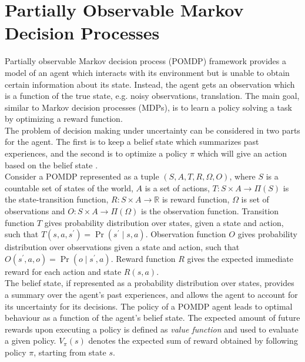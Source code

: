 \section{Partially Observable Markov Decision Processes}
\label{sec:belief_POMDP}
Partially observable Markov decision process (POMDP) framework provides a model of an agent which interacts with its environment but is unable to obtain certain information about its state. Instead, the agent gets an observation which is a function of the true state, e.g. noisy observations, translation. The main goal, similar to Markov decision processes (MDPs), is to learn a policy solving a task by optimizing a reward function. \\
The problem of decision making under uncertainty can be considered in two parts for the agent. The first is to keep a belief state which summarizes past experiences, and the second is to optimize a policy $ \pi $ which will give an action based on the belief state \cite{KAELBLING199899,Murphy2000}.\\
Consider a POMDP represented as a tuple $ (S, A, T, R, \Omega, O) $, where $ S $ is a countable set of states of the world, $ A $ is a set of actions, $ T: S \times A \rightarrow \varPi(S) $ is the state-transition function, $ R: S\times A \rightarrow \mathbb{R} $ is reward function, $ \Omega $ is set of observations and $ O:S\times A \rightarrow \varPi(\Omega)$ is the observation function. Transition function $ T $ gives probability distribution over states, given a state and action, such that $ T(s, a, s^\prime) = \operatorname{Pr}(s^\prime \mid s, a) $. Observation function $ O $ gives probability distribution over observations given a state and action, such that $ O(s^\prime, a, o) = \operatorname{Pr}(o \mid s^\prime, a) $. Reward function $ R $ gives the expected immediate reward for each action and state $ R(s,a) $.\\
The belief state, if represented as a probability distribution over states, provides a summary over the agent's past experiences, and allows the agent to account for its uncertainty for its decisions. The policy of a POMDP agent leads to optimal behaviour as a function of the agent's belief state. %
The expected amount of future rewards upon executing a policy is defined as \textit{value function} and used to evaluate a given policy. $ V_\pi(s) $ denotes the expected sum of reward obtained by following policy $ \pi $, starting from state $ s $.\\
